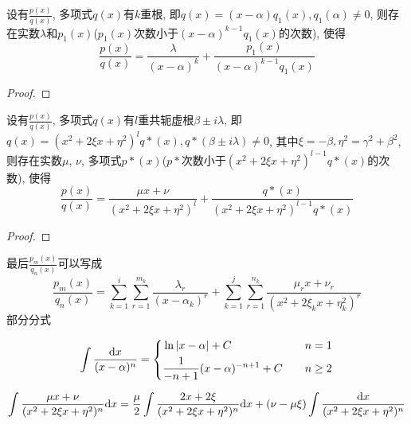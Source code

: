 \begin{theorem}
    设有$\frac{p(x)}{q(x)}$, 多项式$q(x)$有$k$重根, 即$q(x)=(x-\alpha)q_1(x), q_1(\alpha) \neq 0$, 则存在实数$\lambda$和$p_1(x)$($p_1(x)$次数小于$(x-\alpha)^{k-1}q_1(x)$的次数), 使得
    \begin{equation}
        \frac{p(x)}{q(x)} = \frac{\lambda}{(x-\alpha)^k} + \frac{p_1(x)}{(x-\alpha)^{k-1}q_1(x)}
    \end{equation}
\end{theorem}
\begin{proof}
    
\end{proof}

\begin{theorem}
    设有$\frac{p(x)}{q(x)}$, 多项式$q(x)$有$l$重共轭虚根$\beta\pm i\lambda$, 即$q(x) = (x^2+2\xi x+ \eta^2)^l q*(x), q*(\beta\pm i\lambda) \neq 0$, 其中$\xi = -\beta, \eta^2 = \gamma^2+\beta^2$, 则存在实数$\mu$, $\nu$, 多项式$p*(x)$($p*$次数小于$(x^2+2\xi x+\eta^2)^{l-1}q*(x)$的次数), 使得
    \begin{equation}
        \frac{p(x)}{q(x)} = \frac{\mu x + \nu}{(x^2+2\xi x+\eta^2)^l} + \frac{q*(x)}{(x^2+2\xi x+\eta^2)^{l-1}q*(x)}
    \end{equation}
\end{theorem}
\begin{proof}
    
\end{proof}

最后$\frac{p_m(x)}{q_n(x)}$可以写成
\begin{equation*}
    \frac{p_m(x)}{q_n(x)} = \sum_{k=1}^{i}\sum_{r=1}^{m_k}\frac{\lambda_r}{(x-\alpha_k)^r}+\sum_{k=1}^{j}\sum_{r=1}^{n_k}\frac{\mu_r x+ \nu_r}{(x^2+2\xi_k x +\eta_k^2)^r}
\end{equation*}
部分分式

\begin{equation*}
    \int \frac{\mathrm{d} x}{(x-\alpha)^n} = \left\{
        \begin{aligned}
            &\ln|x-\alpha| + C &\quad n = 1 \\
            &\frac{1}{-n+1}(x-\alpha)^{-n+1} + C &\quad n \ge 2
        \end{aligned}
    \right.    
\end{equation*}

\begin{equation*}
    \int \frac{\mu x + \nu}{(x^2+2\xi x+\eta^2)^n}\mathrm{d} x = \frac{\mu}{2}\int\frac{2x+2\xi}{(x^2+2\xi x+\eta^2)^n} \mathrm{d} x + (\nu-\mu \xi)\int\frac{\mathrm{d} x}{(x^2+2\xi x+\eta^2)^n}
\end{equation*}

